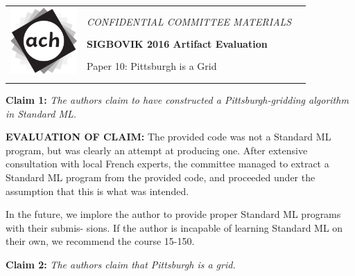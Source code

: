 \documentclass[12pt]{article}
\begin{document}
 {\sffamily
 \begin{tabular}{lll}
 \multirow{8}{1in}{\includegraphics[width=1in]{ach.png}} & &\\%
 & &\\
 & \large{\em CONFIDENTIAL COMMITTEE MATERIALS} &\\
 & &\\
 & \textbf{\LARGE{SIGBOVIK 2016 Artifact Evaluation}}& \\
 & &\\
 & \Large{Paper 10: Pittsburgh is a Grid} & \\
 &\\
 \vspace{1em}\\
 \hline
 \end{tabular}}
 \vspace{2em}
 \thispagestyle{empty}


\textbf{Claim 1:}  \textit{The authors claim to have constructed a Pittsburgh-gridding algorithm in Standard ML.}

\textbf{EVALUATION OF CLAIM:}
  The provided code was not a Standard ML program, but was clearly
  an attempt at producing one. After extensive consultation with local French experts, the committee
  managed to extract a Standard ML program from the provided code, and proceeded under the
  assumption that this is what was intended.

  In the future, we implore the author to provide proper Standard ML programs with their submis-
  sions. If the author is incapable of learning Standard ML on their own, we recommend the course
  15-150.

\textbf{Claim 2:}  \textit{The authors claim that Pittsburgh is a grid.}
\end{document}
